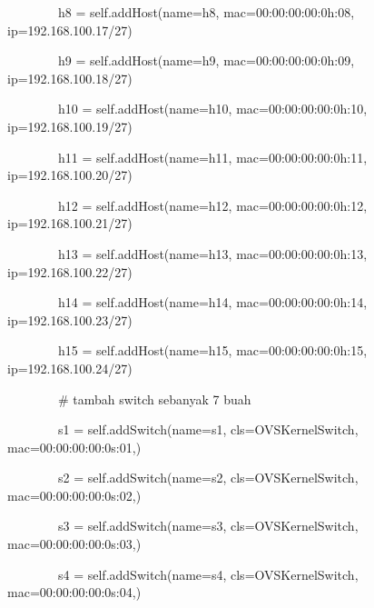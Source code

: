 \ \ \ \ \ \ \ \ h8 = self.addHost(name={\textquotedbl}h8{\textquotedbl},
mac={\textquotedbl}00:00:00:00:0h:08{\textquotedbl}, ip={\textquotedbl}192.168.100.17/27{\textquotedbl})

\ \ \ \ \ \ \ \ h9 = self.addHost(name={\textquotedbl}h9{\textquotedbl},
mac={\textquotedbl}00:00:00:00:0h:09{\textquotedbl}, ip={\textquotedbl}192.168.100.18/27{\textquotedbl})

\ \ \ \ \ \ \ \ h10 = self.addHost(name={\textquotedbl}h10{\textquotedbl},
mac={\textquotedbl}00:00:00:00:0h:10{\textquotedbl}, ip={\textquotedbl}192.168.100.19/27{\textquotedbl})

\ \ \ \ \ \ \ \ h11 = self.addHost(name={\textquotedbl}h11{\textquotedbl},
mac={\textquotedbl}00:00:00:00:0h:11{\textquotedbl}, ip={\textquotedbl}192.168.100.20/27{\textquotedbl})

\ \ \ \ \ \ \ \ h12 = self.addHost(name={\textquotedbl}h12{\textquotedbl},
mac={\textquotedbl}00:00:00:00:0h:12{\textquotedbl}, ip={\textquotedbl}192.168.100.21/27{\textquotedbl})

\ \ \ \ \ \ \ \ h13 = self.addHost(name={\textquotedbl}h13{\textquotedbl},
mac={\textquotedbl}00:00:00:00:0h:13{\textquotedbl}, ip={\textquotedbl}192.168.100.22/27{\textquotedbl})

\ \ \ \ \ \ \ \ h14 = self.addHost(name={\textquotedbl}h14{\textquotedbl},
mac={\textquotedbl}00:00:00:00:0h:14{\textquotedbl}, ip={\textquotedbl}192.168.100.23/27{\textquotedbl})

\ \ \ \ \ \ \ \ h15 = self.addHost(name={\textquotedbl}h15{\textquotedbl},
mac={\textquotedbl}00:00:00:00:0h:15{\textquotedbl}, ip={\textquotedbl}192.168.100.24/27{\textquotedbl})

\bigskip

\ \ \ \ \ \ \ \ \# tambah switch sebanyak 7 buah

\ \ \ \ \ \ \ \ s1 = self.addSwitch(name={\textquotedbl}s1{\textquotedbl}, cls=OVSKernelSwitch,
mac={\textquotedbl}00:00:00:00:0s:01{\textquotedbl},)

\ \ \ \ \ \ \ \ s2 = self.addSwitch(name={\textquotedbl}s2{\textquotedbl}, cls=OVSKernelSwitch,
mac={\textquotedbl}00:00:00:00:0s:02{\textquotedbl},)

\ \ \ \ \ \ \ \ s3 = self.addSwitch(name={\textquotedbl}s3{\textquotedbl}, cls=OVSKernelSwitch,
mac={\textquotedbl}00:00:00:00:0s:03{\textquotedbl},)

\ \ \ \ \ \ \ \ s4 = self.addSwitch(name={\textquotedbl}s4{\textquotedbl}, cls=OVSKernelSwitch,
mac={\textquotedbl}00:00:00:00:0s:04{\textquotedbl},)

